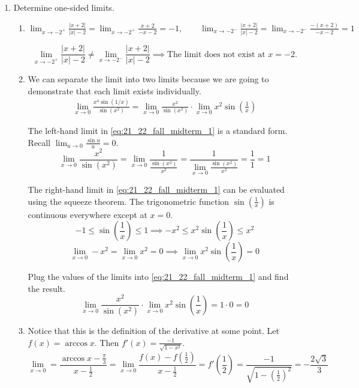 \documentclass[a4paper, 12pt]{article}
\renewcommand{\headrulewidth}{0pt}
\begin{document}
\newpage
\pagestyle{fancy}
\renewcommand{\headrulewidth}{1pt}


\begin{enumerate}[leftmargin=*,label=\textbf{\arabic*.}]
\item Determine one-sided limits.
\begin{enumerate}[leftmargin=*,label=\textbf{\alph*.}]
\item $\displaystyle\lim_{x\to-2^+}\frac{\left|x+2\right|}{\left|x\right|-2}=\lim_{x\to-2^+}\frac{x+2}{-x-2}=-1,\quad\quad\lim_{x\to-2^-}\frac{\left|x+2\right|}{\left|x\right|-2}=\lim_{x\to-2^-}\frac{-(x+2)}{-x-2}=1$

\[\lim_{x\to-2^+}\frac{\left|x+2\right|}{\left|x\right|-2}\neq\lim_{x\to-2^-}\frac{\left|x+2\right|}{\left|x\right|-2}\implies\boxed{\text{The limit does not exist at }x=-2.}\]

\item We can separate the limit into two limits because we are going to demonstrate that each limit exists individually.
\begin{align}\lim_{x\to0}\frac{x^4\sin(1/x)}{\sin\left(x^2\right)}=\lim_{x\to0}\frac{x^2}{\sin\left(x^2\right)}\cdot\lim_{x\to0}x^2\sin\left(\frac1x\right)\label{eq:21_22_fall_midterm_1}\end{align}

The left-hand limit in \eqref{eq:21_22_fall_midterm_1} is a standard form. Recall $\displaystyle\lim_{u\to0}\frac{\sin u}u=0$.
\[\lim_{x\to0}\frac{x^2}{\sin\left(x^2\right)}=\lim_{x\to0}\frac1{\displaystyle\frac{\sin\left(x^2\right)}{x^2}}=\frac1{\displaystyle\lim_{x\to 0}\frac{\sin\left(x^2\right)}{x^2}}=\frac11=1\]

The right-hand limit in \eqref{eq:21_22_fall_midterm_1} can be evaluated using the squeeze theorem. The trigonometric function $\displaystyle\sin\left(\frac1x\right)$ is continuous everywhere except at $x=0$.
\[-1\leq\sin\left(\frac1x\right)\leq1\implies -x^2\leq x^2\sin\left(\frac1x\right)\leq x^2\]
\[\lim_{x\to0}-x^2=\lim_{x\to0}x^2=0\implies\lim_{x\to0}x^2\sin\left(\frac1x\right)=0\]

Plug the values of the limits into \eqref{eq:21_22_fall_midterm_1} and find the result.
\[\lim_{x\to0}\frac{x^2}{\sin\left(x^2\right)}\cdot\lim_{x\to0}x^2\sin\left(\frac1x\right)=1\cdot0=\boxed0\]

\item Notice that this is the definition of the derivative at some point. Let $f(x)=\arccos x$. Then $\displaystyle f'(x) =\frac{-1}{\sqrt{1-x^2}}$.
\[\lim_{x\to0}=\frac{\arccos x -\frac\pi3}{x-\frac12}=\lim_{x\to0}\frac{f(x)-f\left(\frac12\right)}{x-\frac12}=f'\left(\frac12\right)=\frac{-1}{\sqrt{1-\left(\frac12\right)^2}}=\boxed{-\frac{2\sqrt3}{3}}\]
\end{enumerate}


\end{enumerate}
\end{document}

